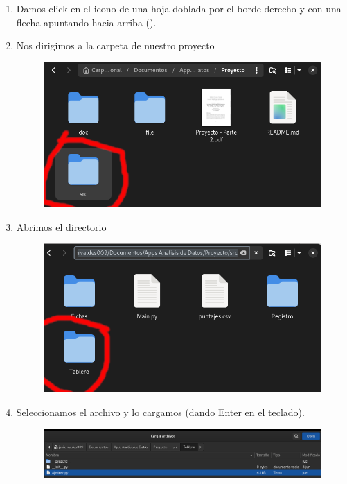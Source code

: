 \documentclass[12pt, Tahoma]{article}
\begin{document}
\begin{enumerate}
\begin{figure}[H]
			\end{figure}
		\item Damos click en el icono de una hoja doblada por el borde derecho y con una flecha apuntando hacia arriba ().
		\item Nos dirigimos a la carpeta  de nuestro proyecto
			\begin{figure}[H]
				\centering
				\includegraphics[scale=1.5]{correr4.png}
			\end{figure}
		\item Abrimos el directorio 
			\begin{figure}[H]
				\centering
				\includegraphics[scale=1.5]{correr12.png}
			\end{figure}
		\item Seleccionamos el archivo  y lo cargamos (dando Enter en el teclado).
			\begin{figure}[H]
				\centering
				\includegraphics[scale=1.5]{correr13.png}

\end{figure}
\end{enumerate}
\end{document}
